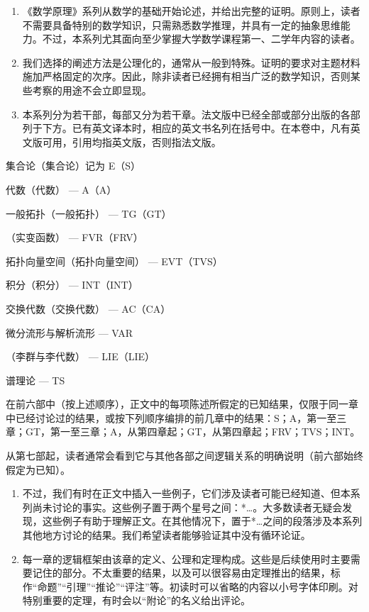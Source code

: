 
\begin{enumerate}
\def\labelenumi{\arabic{enumi}.}
\item
  《数学原理》系列从数学的基础开始论述，并给出完整的证明。原则上，读者不需要具备特别的数学知识，只需熟悉数学推理，并具有一定的抽象思维能力。不过，本系列尤其面向至少掌握大学数学课程第一、二学年内容的读者。
\item
  我们选择的阐述方法是公理化的，通常从一般到特殊。证明的要求对主题材料施加严格固定的次序。因此，除非读者已经拥有相当广泛的数学知识，否则某些考察的用途不会立即显现。
\item
  本系列分为若干部，每部又分为若干章。法文版中已经全部或部分出版的各部列于下方。已有英文译本时，相应的英文书名列在括号中。在本卷中，凡有英文版可用，引用均指英文版，否则指法文版。
\end{enumerate}

集合论（集合论）记为 E（S）

代数（代数） --- A（A）

一般拓扑（一般拓扑） --- TG（GT）

（实变函数） --- FVR（FRV）

拓扑向量空间（拓扑向量空间） --- EVT（TVS）

积分（积分） --- INT（INT）

交换代数（交换代数） --- AC（CA）

微分流形与解析流形 --- VAR

（李群与李代数） --- LIE（LIE）

谱理论 --- TS

在前六部中（按上述顺序），正文中的每项陈述所假定的已知结果，仅限于同一章中已经讨论过的结果，或按下列顺序编排的前几章中的结果：S；A，第一至三章；GT，第一至三章；A，从第四章起；GT，从第四章起；FRV；TVS；INT。

从第七部起，读者通常会看到它与其他各部之间逻辑关系的明确说明（前六部始终假定为已知）。

\begin{enumerate}
\def\labelenumi{\arabic{enumi}.}
\setcounter{enumi}{3}
\item
  不过，我们有时在正文中插入一些例子，它们涉及读者可能已经知道、但本系列尚未讨论的事实。这些例子置于两个星号之间：*\ldots*。大多数读者无疑会发现，这些例子有助于理解正文。在其他情况下，置于*\ldots*之间的段落涉及本系列其他地方讨论的结果。我们希望读者能够验证其中没有循环论证。
\item
  每一章的逻辑框架由该章的定义、公理和定理构成。这些是后续使用时主要需要记住的部分。不太重要的结果，以及可以很容易由定理推出的结果，标作“命题”“引理”“推论”“评注”等。初读时可以省略的内容以小号字体印刷。对特别重要的定理，有时会以“附论”的名义给出评论。
\end{enumerate}

